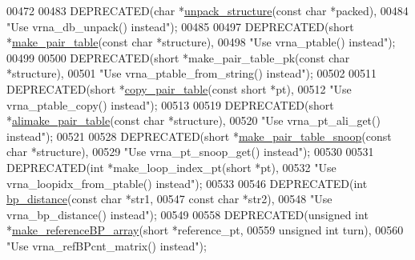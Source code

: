 \begin{DoxyCode}
00472 
00483 DEPRECATED(\textcolor{keywordtype}{char} *\hyperlink{group__struct__utils_ga071c6921efe1eb974f115ee6fefa3c39}{unpack\_structure}(\textcolor{keyword}{const} \textcolor{keywordtype}{char} *packed),
00484 \textcolor{stringliteral}{"Use vrna\_db\_unpack() instead"});
00485 
00497 DEPRECATED(\textcolor{keywordtype}{short} *\hyperlink{group__struct__utils_ga89c32307ee50a0026f4a3131fac0845a}{make\_pair\_table}(\textcolor{keyword}{const} \textcolor{keywordtype}{char} *structure),
00498 \textcolor{stringliteral}{"Use vrna\_ptable() instead"});
00499 
00500 DEPRECATED(\textcolor{keywordtype}{short} *make\_pair\_table\_pk(\textcolor{keyword}{const} \textcolor{keywordtype}{char} *structure),
00501 \textcolor{stringliteral}{"Use vrna\_ptable\_from\_string() instead"});
00502 
00511 DEPRECATED(\textcolor{keywordtype}{short} *\hyperlink{group__struct__utils_gafeaa6d68eef3a99d0a7aa08aa91c6601}{copy\_pair\_table}(\textcolor{keyword}{const} \textcolor{keywordtype}{short} *pt),
00512 \textcolor{stringliteral}{"Use vrna\_ptable\_copy() instead"});
00513 
00519 DEPRECATED(\textcolor{keywordtype}{short} *\hyperlink{group__struct__utils_ga3c81b3967056c3888b8472b65fbb16f5}{alimake\_pair\_table}(\textcolor{keyword}{const} \textcolor{keywordtype}{char} *structure),
00520 \textcolor{stringliteral}{"Use vrna\_pt\_ali\_get() instead"});
00521 
00528 DEPRECATED(\textcolor{keywordtype}{short} *\hyperlink{group__struct__utils_ga9aa3bf3b4346bb7fb88efc154dd07a79}{make\_pair\_table\_snoop}(\textcolor{keyword}{const} \textcolor{keywordtype}{char} *structure),
00529 \textcolor{stringliteral}{"Use vrna\_pt\_snoop\_get() instead"});
00530 
00531 DEPRECATED(\textcolor{keywordtype}{int} *make\_loop\_index\_pt(\textcolor{keywordtype}{short} *pt),
00532 \textcolor{stringliteral}{"Use vrna\_loopidx\_from\_ptable() instead"});
00533 
00546 DEPRECATED(\textcolor{keywordtype}{int} \hyperlink{group__struct__utils_ga6ebbcd29a754f0e4f1a66d1fd84184db}{bp\_distance}(\textcolor{keyword}{const} \textcolor{keywordtype}{char} *str1,
00547                            \textcolor{keyword}{const} \textcolor{keywordtype}{char} *str2),
00548 \textcolor{stringliteral}{"Use vrna\_bp\_distance() instead"});
00549 
00558 DEPRECATED(\textcolor{keywordtype}{unsigned} \textcolor{keywordtype}{int} *\hyperlink{group__struct__utils_ga578cd9712dee812fb1c58aa3cc489864}{make\_referenceBP\_array}(\textcolor{keywordtype}{short}         *reference\_pt,
00559                                                 \textcolor{keywordtype}{unsigned} \textcolor{keywordtype}{int}  turn),
00560 \textcolor{stringliteral}{"Use vrna\_refBPcnt\_matrix() instead"});

\end{DoxyCode}
